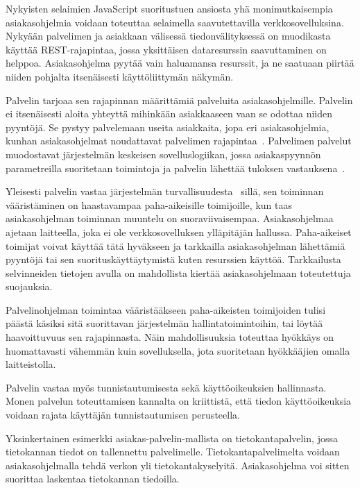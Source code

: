 \documentclass[finnish]{tktltiki2}
\theoremstyle{definition}
\theoremstyle{remark}
\begin{document}
Nykyisten selaimien JavaScript suoritustuen ansiosta yhä
monimutkaisempia asiakasohjelmia voidaan toteuttaa
selaimella saavutettavilla verkkosovelluksina.
Nykyään palvelimen ja asiakkaan
välisessä tiedonvälityksessä on muodikasta käyttää REST-rajapintaa, jossa
yksittäisen dataresurssin saavuttaminen on helppoa.
Asiakasohjelma pyytää vain haluamansa resurssit, ja ne saatuaan piirtää
niiden pohjalta
itsenäisesti käyttöliittymän näkymän.

Palvelin tarjoaa sen rajapinnan määrittämiä palveluita asiakasohjelmille.
Palvelin ei itsenäisesti aloita yhteyttä mihinkään
asiakkaaseen vaan se odottaa niiden pyyntöjä.
Se pystyy palvelemaan useita asiakkaita, jopa
eri asiakasohjelmia, kunhan asiakasohjelmat noudattavat
palvelimen rajapintaa~\cite{sinha_client-server_1992}.
Palvelimen palvelut muodostavat järjestelmän keskeisen
sovelluslogiikan, jossa asiakaspyynnön parametreilla
suoritetaan toimintoja ja palvelin lähettää
tuloksen vastauksena~\cite{sinha_client-server_1992}.

Yleisesti palvelin vastaa järjestelmän turvallisuudesta~\cite{sinha_client-server_1992} sillä,
sen toiminnan vääristäminen on haastavampaa paha-aikeisille
toimijoille, kun taas asiakasohjelman toiminnan muuntelu on suoraviivaisempaa.
Asiakasohjelmaa ajetaan laitteella, joka ei ole verkkosovelluksen
ylläpitäjän hallussa. Paha-aikeiset toimijat voivat käyttää tätä hyväkseen
ja tarkkailla asiakasohjelman lähettämiä pyyntöjä tai sen
suorituskäyttäytymistä kuten resurssien käyttöä.
Tarkkailusta selvinneiden tietojen avulla on mahdollista
kiertää asiakasohjelmaan toteutettuja suojauksia.

Palvelinohjelman toimintaa vääristääkseen
paha-aikeisten toimijoiden tulisi päästä
käsiksi sitä suorittavan järjestelmän hallintatoimintoihin, tai
löytää haavoittuvuus sen rajapinnasta. Näin mahdollisuuksia
toteuttaa hyökkäys on huomattavasti vähemmän kuin sovelluksella, jota
suoritetaan hyökkääjien omalla laitteistolla.

Palvelin vastaa myös tunnistautumisesta sekä käyttöoikeuksien hallinnasta.
Monen palvelun toteuttamisen kannalta on kriittistä, että
tiedon käyttöoikeuksia voidaan rajata käyttäjän tunnistautumisen perusteella.

Yksinkertainen esimerkki asiakas-palvelin-mallista on tietokantapalvelin,
jossa tietokannan tiedot on tallennettu palvelimelle. Tietokantapalvelimelta
voidaan asiakasohjelmalla tehdä verkon yli tietokantakyselyitä. Asiakasohjelma
voi sitten suorittaa laskentaa tietokannan tiedoilla.
\end{document}
